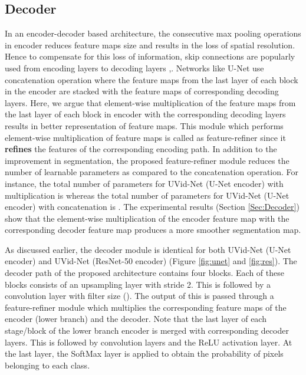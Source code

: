 \documentclass[journal]{IEEEtran}
\begin{document}
\subsection{Decoder} 
\label{SubSec:Decoder}
\par  
In an encoder-decoder based architecture, the consecutive max pooling operations in encoder reduces feature maps size and results in the loss of spatial resolution. Hence to compensate for this loss of information, skip connections are popularly used from encoding layers to decoding layers \cite{2},\cite{4}. Networks like U-Net use concatenation operation where the feature maps from the last layer of each block in the encoder are stacked with the feature maps of corresponding decoding layers. Here, we argue that element-wise multiplication of the feature maps from the last layer of each block in encoder with the corresponding decoding layers results in better representation of feature maps. This module which performs element-wise multiplication of feature maps is called as feature-refiner since it \textbf{refines} the features of the corresponding encoding path. In addition to the improvement in segmentation, the proposed feature-refiner module reduces the number of learnable parameters as compared to the concatenation operation.  For instance, the total number of parameters for UVid-Net (U-Net encoder) with multiplication is  whereas the total number of parameters for UVid-Net (U-Net encoder) with concatenation is . The experimental results (Section \ref{Sec:Decoder}) show that the element-wise multiplication of the encoder feature map with the corresponding decoder feature map produces a more smoother segmentation map.


As discussed earlier, the decoder module is identical for both UVid-Net (U-Net encoder) and UVid-Net (ResNet-50 encoder) (Figure \ref{fig:unet} and \ref{fig:res}). The decoder path of the proposed architecture contains four blocks. Each of these blocks consists of an upsampling layer with stride 2. This is followed by a convolution layer with filter size (). The output of this is passed through a feature-refiner module which multiplies the corresponding feature maps of the encoder (lower branch) and the decoder. Note that the last layer of each stage/block of the lower branch encoder is merged with corresponding decoder layers.  This is followed by convolution layers and the ReLU activation layer. At the last layer, the SoftMax layer is applied to obtain the probability of pixels belonging to each class. 
\end{document}
